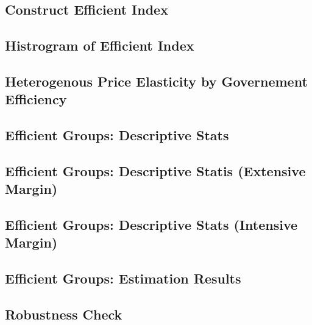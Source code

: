\documentclass[ review  , 3p ]{elsarticle}
\begin{document}
  \hypertarget{construct-efficient-index}{%
  \subsection{Construct Efficient Index}\label{construct-efficient-index}}
  
  \hypertarget{histrogram-of-efficient-index}{%
  \subsection{Histrogram of Efficient Index}\label{histrogram-of-efficient-index}}
  
  \hypertarget{heterogenous-price-elasticity-by-governement-efficiency}{%
  \subsection{Heterogenous Price Elasticity by Governement Efficiency}\label{heterogenous-price-elasticity-by-governement-efficiency}}
  
  \hypertarget{efficient-groups-descriptive-stats}{%
  \subsection{Efficient Groups: Descriptive Stats}\label{efficient-groups-descriptive-stats}}
  
  \hypertarget{efficient-groups-descriptive-statis-extensive-margin}{%
  \subsection{Efficient Groups: Descriptive Statis (Extensive Margin)}\label{efficient-groups-descriptive-statis-extensive-margin}}
  
  \hypertarget{efficient-groups-descriptive-stats-intensive-margin}{%
  \subsection{Efficient Groups: Descriptive Stats (Intensive Margin)}\label{efficient-groups-descriptive-stats-intensive-margin}}
  
  \hypertarget{efficient-groups-estimation-results}{%
  \subsection{Efficient Groups: Estimation Results}\label{efficient-groups-estimation-results}}
  
  \hypertarget{robustness-check-2}{%
  \subsection{Robustness Check}\label{robustness-check-2}}
  
\end{document}

